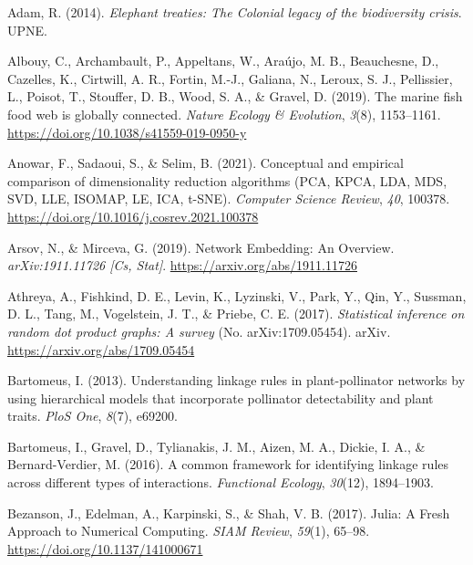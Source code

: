 \documentclass[10pt,oneside]{article}
\newlength{\cslhangindent}
\newenvironment{CSLReferences}[2] %
 {%
  \setlength{\parindent}{0pt}
  \ifodd #1 \everypar{\setlength{\hangindent}{\cslhangindent}}\ignorespaces\fi
  \ifnum #2 > 0
  \setlength{\parskip}{#2\baselineskip}
  \fi
 }%
 {}
\begin{document}
\hypertarget{refs}{}
\begin{CSLReferences}{1}{0}
\leavevmode{}%
Adam, R. (2014). \emph{Elephant treaties: The Colonial legacy of the
biodiversity crisis}. UPNE.

\leavevmode{}%
Albouy, C., Archambault, P., Appeltans, W., Araújo, M. B., Beauchesne,
D., Cazelles, K., Cirtwill, A. R., Fortin, M.-J., Galiana, N., Leroux,
S. J., Pellissier, L., Poisot, T., Stouffer, D. B., Wood, S. A., \&
Gravel, D. (2019). The marine fish food web is globally connected.
\emph{Nature Ecology \& Evolution}, \emph{3}(8), 1153--1161.
\url{https://doi.org/10.1038/s41559-019-0950-y}

\leavevmode{}%
Anowar, F., Sadaoui, S., \& Selim, B. (2021). Conceptual and empirical
comparison of dimensionality reduction algorithms (PCA, KPCA, LDA, MDS,
SVD, LLE, ISOMAP, LE, ICA, t-SNE). \emph{Computer Science Review},
\emph{40}, 100378. \url{https://doi.org/10.1016/j.cosrev.2021.100378}

\leavevmode{}%
Arsov, N., \& Mirceva, G. (2019). Network Embedding: An Overview.
\emph{arXiv:1911.11726 {[}Cs, Stat{]}}.
\url{https://arxiv.org/abs/1911.11726}

\leavevmode{}%
Athreya, A., Fishkind, D. E., Levin, K., Lyzinski, V., Park, Y., Qin,
Y., Sussman, D. L., Tang, M., Vogelstein, J. T., \& Priebe, C. E.
(2017). \emph{Statistical inference on random dot product graphs: A
survey} (No. arXiv:1709.05454). arXiv.
\url{https://arxiv.org/abs/1709.05454}

\leavevmode{}%
Bartomeus, I. (2013). Understanding linkage rules in plant-pollinator
networks by using hierarchical models that incorporate pollinator
detectability and plant traits. \emph{PloS One}, \emph{8}(7), e69200.

\leavevmode{}%
Bartomeus, I., Gravel, D., Tylianakis, J. M., Aizen, M. A., Dickie, I.
A., \& Bernard-Verdier, M. (2016). A common framework for identifying
linkage rules across different types of interactions. \emph{Functional
Ecology}, \emph{30}(12), 1894--1903.

\leavevmode{}%
Bezanson, J., Edelman, A., Karpinski, S., \& Shah, V. B. (2017). Julia:
A Fresh Approach to Numerical Computing. \emph{SIAM Review},
\emph{59}(1), 65--98. \url{https://doi.org/10.1137/141000671}


\end{CSLReferences}
\end{document}
